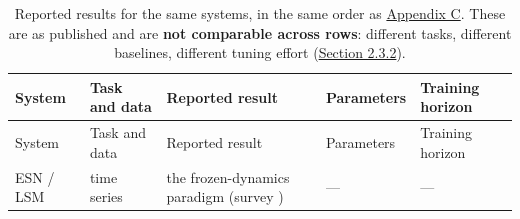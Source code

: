 \documentclass[10pt]{article}
\begin{document}
\begin{longtable}[]{@{}
  >{\raggedright\arraybackslash}p{}
  >{\raggedright\arraybackslash}p{}
  >{\raggedright\arraybackslash}p{}
  >{\raggedright\arraybackslash}p{}
  >{\raggedright\arraybackslash}p{}@{}}
\caption{Reported results for the same systems, in the same order as
\hyperref[sec-C]{Appendix C}. These are as published and are \textbf{not
comparable across rows}: different tasks, different baselines, different
tuning effort (\hyperref[sec-2-3-2]{Section 2.3.2}).}\tabularnewline
\toprule\noalign{}
\begin{minipage}[b]{\linewidth}\raggedright
System
\end{minipage} & \begin{minipage}[b]{\linewidth}\raggedright
Task and data
\end{minipage} & \begin{minipage}[b]{\linewidth}\raggedright
Reported result
\end{minipage} & \begin{minipage}[b]{\linewidth}\raggedright
Parameters
\end{minipage} & \begin{minipage}[b]{\linewidth}\raggedright
Training horizon
\end{minipage} \\
\midrule\noalign{}
\endfirsthead
\toprule\noalign{}
\begin{minipage}[b]{\linewidth}\raggedright
System
\end{minipage} & \begin{minipage}[b]{\linewidth}\raggedright
Task and data
\end{minipage} & \begin{minipage}[b]{\linewidth}\raggedright
Reported result
\end{minipage} & \begin{minipage}[b]{\linewidth}\raggedright
Parameters
\end{minipage} & \begin{minipage}[b]{\linewidth}\raggedright
Training horizon
\end{minipage} \\
\midrule\noalign{}
\endhead
\bottomrule\noalign{}
\endlastfoot
ESN / LSM & time series & the frozen-dynamics paradigm (survey
\citep{lukosevicius2009}) & --- & --- \\

\end{longtable}
\end{document}
